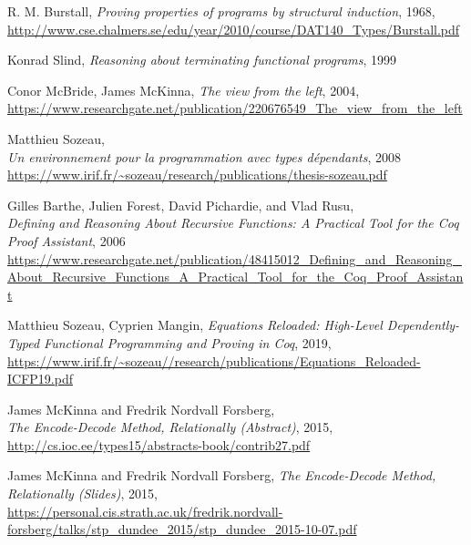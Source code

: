 \documentclass[declaration,mgr,english,shortabstract]{iithesis}
\begin{document}
\begin{thebibliography}{1}
    R. M. Burstall,
    \textit{Proving properties of programs by structural induction},
    1968, \\
    \url{http://www.cse.chalmers.se/edu/year/2010/course/DAT140_Types/Burstall.pdf}

    Konrad Slind,
    \textit{Reasoning about terminating functional programs},
    1999

    Conor McBride, James McKinna,
    \textit{The view from the left},
    2004, \\
    \url{https://www.researchgate.net/publication/220676549_The_view_from_the_left}

    Matthieu Sozeau, \\
    \textit{Un environnement pour la programmation avec types d\'{e}pendants},
    2008 \\
    \url{https://www.irif.fr/~sozeau/research/publications/thesis-sozeau.pdf}

    Gilles Barthe, Julien Forest, David Pichardie, and Vlad Rusu, \\
    \textit{Defining and Reasoning About Recursive
    Functions: A Practical Tool for the Coq
    Proof Assistant},
    2006 \\
    \url{https://www.researchgate.net/publication/48415012_Defining_and_Reasoning_About_Recursive_Functions_A_Practical_Tool_for_the_Coq_Proof_Assistant}

    Matthieu Sozeau, Cyprien Mangin,
    \textit{Equations Reloaded: High-Level Dependently-Typed Functional Programming and Proving in Coq},
    2019,
    \url{https://www.irif.fr/~sozeau//research/publications/Equations_Reloaded-ICFP19.pdf}

    James McKinna and Fredrik Nordvall Forsberg, \\
    \textit{The Encode-Decode Method, Relationally (Abstract)},
    2015, \\
    \url{http://cs.ioc.ee/types15/abstracts-book/contrib27.pdf}

    James McKinna and Fredrik Nordvall Forsberg,
    \textit{The Encode-Decode Method, Relationally (Slides)},
    2015, \\
    \url{https://personal.cis.strath.ac.uk/fredrik.nordvall-forsberg/talks/stp_dundee_2015/stp_dundee_2015-10-07.pdf}

\end{thebibliography}
\end{document}
